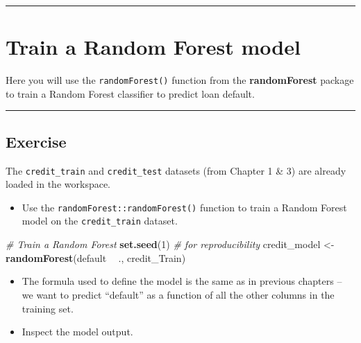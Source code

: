 \documentclass[
]{book}
\newenvironment{Shaded}{\begin{snugshade}}{\end{snugshade}}
\newcommand{\CommentTok}[1]{\textcolor[rgb]{0.56,0.35,0.01}{\textit{#1}}}
\newcommand{\DecValTok}[1]{\textcolor[rgb]{0.00,0.00,0.81}{#1}}
\newcommand{\KeywordTok}[1]{\textcolor[rgb]{0.13,0.29,0.53}{\textbf{#1}}}
\newcommand{\NormalTok}[1]{#1}
\newcommand{\OperatorTok}[1]{\textcolor[rgb]{0.81,0.36,0.00}{\textbf{#1}}}
\newcommand{\StringTok}[1]{\textcolor[rgb]{0.31,0.60,0.02}{#1}}
\providecommand{\tightlist}{%
  \setlength{\itemsep}{0pt}\setlength{\parskip}{0pt}}
\begin{document}
\begin{center}\rule{0.5\linewidth}{0.5pt}\end{center}

\hypertarget{train-a-random-forest-model}{%
\section{Train a Random Forest model}\label{train-a-random-forest-model}}

Here you will use the \texttt{randomForest()} function from the \textbf{randomForest} package to train a Random Forest classifier to predict loan default.

\begin{center}\rule{0.5\linewidth}{0.5pt}\end{center}

\hypertarget{exercise-16}{%
\subsection*{Exercise}\label{exercise-16}}

The \texttt{credit\_train} and \texttt{credit\_test} datasets (from Chapter 1 \& 3) are already loaded in the workspace.

\begin{itemize}
\tightlist
\item
  Use the \texttt{randomForest::randomForest()} function to train a Random Forest model on the \texttt{credit\_train} dataset.
\end{itemize}

\begin{Shaded}
\begin{Highlighting}[]
\CommentTok{# Train a Random Forest}
\KeywordTok{set.seed}\NormalTok{(}\DecValTok{1}\NormalTok{)  }\CommentTok{# for reproducibility}
\NormalTok{credit_model <-}\StringTok{ }\KeywordTok{randomForest}\NormalTok{(default }\OperatorTok{~}\StringTok{ }\NormalTok{., }
\NormalTok{                             credit_Train)}
\end{Highlighting}
\end{Shaded}

\begin{itemize}
\item
  The formula used to define the model is the same as in previous chapters -- we want to predict ``default'' as a function of all the other columns in the training set.
\item
  Inspect the model output.
\end{itemize}
\end{document}
